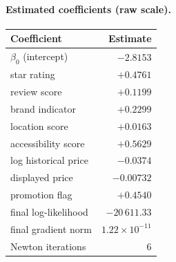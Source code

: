 \documentclass[11pt]{article}
\begin{document}
\paragraph{Estimated coefficients (raw scale).}
\begin{center}
\begin{tabular}{lr}
\toprule
Coefficient & Estimate \\
\midrule
$\beta_0$ (intercept)               & $-2.8153$ \\
star rating                         & $+0.4761$ \\
review score                        & $+0.1199$ \\
brand indicator                     & $+0.2299$ \\
location score                      & $+0.0163$ \\
accessibility score                 & $+0.5629$ \\
log historical price                & $-0.0374$ \\
displayed price                     & $-0.00732$ \\
promotion flag                      & $+0.4540$ \\
\midrule
final log-likelihood                & $-20\,611.33$ \\
final gradient norm                 & $1.22 \times 10^{-11}$ \\
Newton iterations                   & $6$ \\
\bottomrule
\end{tabular}
\end{center}
\end{document}
